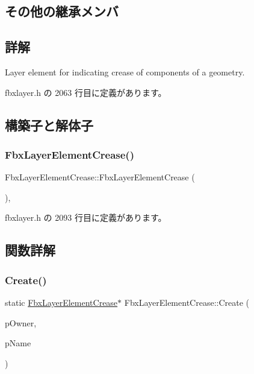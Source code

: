 \subsection*{その他の継承メンバ}


\subsection{詳解}
Layer element for indicating crease of components of a geometry. 

 fbxlayer.\+h の 2063 行目に定義があります。



\subsection{構築子と解体子}
\mbox{\label{class_fbx_layer_element_crease_a7dc7dd72a8045344bd1502dcc4fbf728}} 
\subsubsection{\texorpdfstring{Fbx\+Layer\+Element\+Crease()}{FbxLayerElementCrease()}}
{\footnotesize\ttfamily Fbx\+Layer\+Element\+Crease\+::\+Fbx\+Layer\+Element\+Crease (\begin{DoxyParamCaption}{ }\end{DoxyParamCaption})\hspace{0.3cm}{\ttfamily [inline]}, {\ttfamily [protected]}}



 fbxlayer.\+h の 2093 行目に定義があります。



\subsection{関数詳解}
\mbox{\label{class_fbx_layer_element_crease_a658cc8d2e86ed9c86663e6afc72d229c}} 
\subsubsection{\texorpdfstring{Create()}{Create()}}
{\footnotesize\ttfamily static \hyperlink{class_fbx_layer_element_crease}{Fbx\+Layer\+Element\+Crease}$\ast$ Fbx\+Layer\+Element\+Crease\+::\+Create (\begin{DoxyParamCaption}\item[{\hyperlink{class_fbx_layer_container}{Fbx\+Layer\+Container} $\ast$}]{p\+Owner,  }\item[{const char $\ast$}]{p\+Name }\end{DoxyParamCaption})\hspace{0.3cm}{\ttfamily [static]}}

